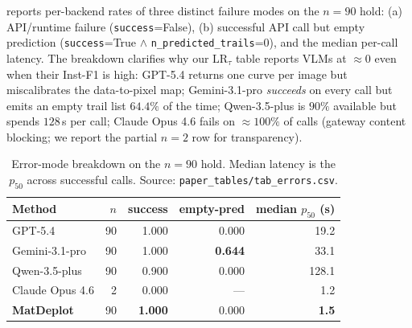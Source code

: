 \documentclass{article}
\begin{document}
 reports per-backend rates of three
distinct failure modes on the $n{=}90$ hold: (a) API/runtime
failure (\texttt{success}=False), (b) successful API call but
empty prediction (\texttt{success}=True $\land$
\texttt{n\_predicted\_trails}=0), and the median per-call
latency. The breakdown clarifies why our $\mathrm{LR}_\tau$
table reports VLMs at $\approx 0$ even when their
Inst-F1 is high: GPT-5.4 returns one curve per image but
miscalibrates the data-to-pixel map; Gemini-3.1-pro
\emph{succeeds} on every call but emits an empty trail list
$64.4\%$ of the time; Qwen-3.5-plus is $90\%$ available but
spends $128$\,s per call; Claude Opus 4.6 fails on
$\approx 100\%$ of calls (gateway content blocking; we report
the partial $n{=}2$ row for transparency).

\begin{table}[h]
\centering
\caption{Error-mode breakdown on the $n{=}90$ hold. Median
latency is the $p_{50}$ across successful calls. Source:
\texttt{paper\_tables/tab\_errors.csv}.}
\label{tab:errors}
\small
\begin{tabular}{lrrrr}
\toprule
Method & $n$ & success & empty-pred & median $p_{50}$ (s) \\
\midrule
GPT-5.4                          & 90 & 1.000 & 0.000 & 19.2 \\
Gemini-3.1-pro                   & 90 & 1.000 & \textbf{0.644} & 33.1 \\
Qwen-3.5-plus                    & 90 & 0.900 & 0.000 & 128.1 \\
Claude Opus 4.6                  & \phantom{0}2 & 0.000 & ---   & 1.2  \\
\textbf{MatDeplot} & 90 & \textbf{1.000} & 0.000 & \textbf{1.5}  \\
\bottomrule
\end{tabular}
\end{table}
\end{document}
